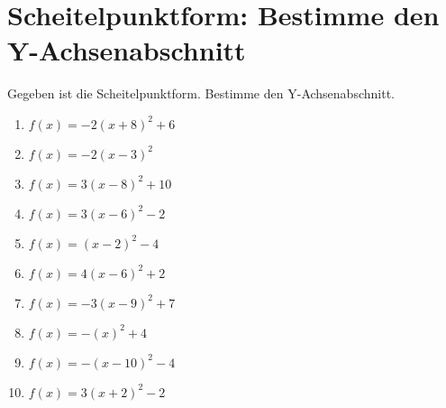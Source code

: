 \documentclass{article}%
\begin{document}
\section{Scheitelpunktform: Bestimme den Y{-}Achsenabschnitt}%
\label{sec:ScheitelpunktformBestimmedenY{-}Achsenabschnitt}%
Gegeben ist die Scheitelpunktform. Bestimme den Y{-}Achsenabschnitt.%
\begin{enumerate}[label=\alph*)]%
\item%
\newline\vspace{0.5cm} $f(x)=-2(x+8)^2 +6$%
\item%
\newline\vspace{0.5cm} $f(x)=-2(x-3)^2$%
\item%
\newline\vspace{0.5cm} $f(x)=3(x-8)^2 +10$%
\item%
\newline\vspace{0.5cm} $f(x)=3(x-6)^2 -2$%
\item%
\newline\vspace{0.5cm} $f(x)=(x-2)^2 -4$%
\item%
\newline\vspace{0.5cm} $f(x)=4(x-6)^2 +2$%
\item%
\newline\vspace{0.5cm} $f(x)=-3(x-9)^2 +7$%
\item%
\newline\vspace{0.5cm} $f(x)=-(x)^2 +4$%
\item%
\newline\vspace{0.5cm} $f(x)=-(x-10)^2 -4$%
\item%
\newline\vspace{0.5cm} $f(x)=3(x+2)^2 -2$%
\end{enumerate}

%
\end{document}
